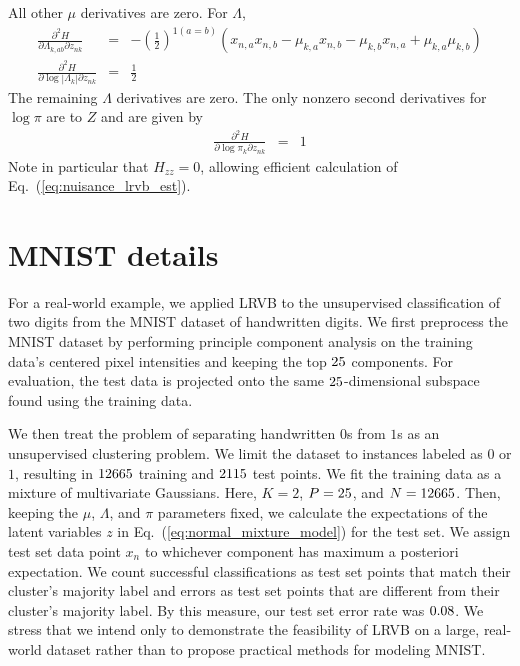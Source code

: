 \documentclass{article}\usepackage[]{graphicx}\usepackage[]{color}
\newcommand{\eq}[1]{Eq.~(\ref{eq:#1})}
\theoremstyle{plain}
\begin{document}
%
All other $\mu$ derivatives are zero. For $\Lambda$,
%
\begin{eqnarray*}
\frac{\partial^{2}H}{\partial\Lambda_{k,ab}\partial z_{nk}} & = & -\left(\frac{1}{2}\right)^{1(a=b)}\left(x_{n,a}x_{n,b}-\mu_{k,a}x_{n,b}-\mu_{k,b}x_{n,a}+\mu_{k,a}\mu_{k,b}\right)\\
\frac{\partial^{2}H}{\partial\log\left|\Lambda_{k}\right|\partial z_{nk}} & = & \frac{1}{2}
\end{eqnarray*}
%
The remaining $\Lambda$ derivatives are zero. The only nonzero second
derivatives for $\log\pi$ are to $Z$ and are given by
%
\begin{eqnarray*}
\frac{\partial^{2}H}{\partial\log\pi_{k}\partial z_{nk}} & = & 1
\end{eqnarray*}
%
Note in particular that $H_{zz} = 0$, allowing efficient calculation of
\eq{nuisance_lrvb_est}.

\section{MNIST details} \label{app:mnist_details}

For a real-world example,
we applied LRVB to the unsupervised classification of two digits
from the MNIST dataset of handwritten digits.
We first preprocess the MNIST dataset by performing principle component
analysis on the training data's centered pixel intensities
and keeping the top $25$ components.
For evaluation, the test data is projected onto the same
$25$-dimensional subspace found using the training data.

We then treat the problem of
separating handwritten $0$s from $1$s as an unsupervised clustering
problem.  We limit the dataset to instances labeled as $0$
or $1$, resulting in $12665$ training and $2115$ test points.
We fit the training data
as a mixture of multivariate Gaussians.  Here, $K=2$, $P=25$, and
$N=12665$.  Then, keeping the $\mu$, $\Lambda$, and $\pi$
parameters fixed, we calculate the expectations of the
latent variables $z$ in \eq{normal_mixture_model} for the test set.
We assign test set data point $x_n$ to whichever component has
maximum a posteriori expectation.  We count successful classifications
as test set points that match their cluster's majority label
and errors as test set points that are different from their cluster's
majority label.  By this measure, our test set error rate was
$0.08$. We stress that we intend only to demonstrate
the feasibility of LRVB on a large, real-world dataset rather than
to propose practical methods for modeling MNIST.
\end{document}
